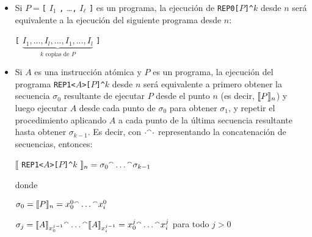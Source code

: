 \begin{itemize}
\item Si $P=$\verb#[# $I_1$ \verb#,# \dots \verb#,# $I_\ell$ \verb#]# es un programa, la ejecución de \verb#REP0[#$P$\verb#]^#$k$ desde $n$ será equivalente a la ejecución del siguiente programa desde $n$: 

\begin{center}
\verb#[# $\underbrace{I_1, \dots, I_l, \dots, I_1, \dots, I_l}_\text{$k$ copias de $P$}$ \verb#]#

\end{center}


\item Si $A$ es una instrucción atómica y $P$ es un programa, la ejecución del programa 
\verb#REP1<#$A$\verb#>[#$P$\verb#]^#$k$ desde $n$ será equivalente a primero obtener la secuencia $\sigma_0$ resultante de ejecutar $P$ desde el punto $n$ (es decir, $\llbracket P\rrbracket_n$) y luego ejecutar $A$ desde cada punto de $\sigma_0$ para obtener $\sigma_1$, y repetir el procedimiento aplicando $A$ a cada punto de la última secuencia resultante hasta obtener $\sigma_{k-1}$. Es decir, con $\cdot{}^\smallfrown\cdot$ representando la concatenación de secuencias, entonces:

\begin{center}

$\llbracket$ \verb#REP1<#$A$\verb#>[#$P$\verb#]^#$k$  $\rrbracket_n = \sigma_0 {}^\smallfrown \dots {}^\smallfrown \sigma_{k-1}$

donde
      
      $\sigma_0 = \llbracket P\rrbracket_n = x_0^0 {}^\smallfrown \dots {}^\smallfrown x_i^0$
      
      
      
      $\sigma_j = \llbracket A\rrbracket_{x_0^{j-1}} {}^\smallfrown \dots {}^\smallfrown \llbracket A\rrbracket_{x_i^{j-1}} = x_0^j {}^\smallfrown \dots {}^\smallfrown x_i^j$ para todo $j>0$



\end{center}
\end{itemize}

